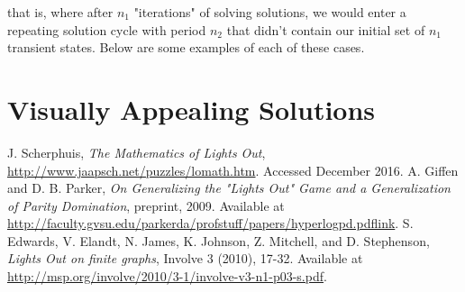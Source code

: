 \documentclass[11pt]{article}
\begin{document}
\noindent that is, where after $n_1$ "iterations" of solving solutions, we would enter a repeating solution cycle with period $n_2$ that didn't contain our initial set of $n_1$ transient states. Below are some examples of each of these cases.

\section*{Visually Appealing Solutions}

\clearpage

\begin{thebibliography}{9}
  J. Scherphuis, \textit{The Mathematics of Lights Out},
  \href{http://www.jaapsch.net/puzzles/lomath.htm}{http://www.jaapsch.net/puzzles/lomath.htm}.
  Accessed December 2016.
  A. Giffen and D. B. Parker, \textit{On Generalizing the "Lights Out" Game and a Generalization of Parity Domination}, preprint, 2009. Available at \href{http://faculty.gvsu.edu/parkerda/profstuff/papers/hyperlogpd.pdf}{http://faculty.gvsu.edu/parkerda/profstuff/papers/hyperlogpd.pdflink}.
  S. Edwards, V. Elandt, N. James, K. Johnson, Z. Mitchell, and D. Stephenson, \textit{Lights Out on finite graphs}, Involve 3 (2010), 17-32. Available at \href{http://msp.org/involve/2010/3-1/involve-v3-n1-p03-s.pdf}{http://msp.org/involve/2010/3-1/involve-v3-n1-p03-s.pdf}.
\end{thebibliography}
\end{document}

